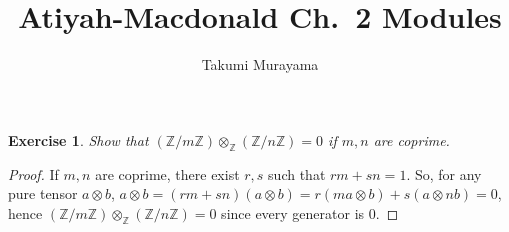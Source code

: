 \documentclass[12pt,letterpaper]{article}
\title{Atiyah-Macdonald Ch.~2 Modules}
\author{Takumi Murayama}
\newtheorem{problem}{Exercise}[section]
\theoremstyle{definition}
\theoremstyle{remark}
\newtheorem*{remark}{Remark}
\numberwithin{figure}{problem}
\numberwithin{equation}{section}
\begin{document}
\maketitle
\setcounter{section}{2}
\begin{problem}
  Show that $(\mathbb{Z}/m\mathbb{Z}) \otimes_{\mathbb{Z}} (\mathbb{Z}/n\mathbb{Z}) = 0$ if $m,n$ are coprime.
\end{problem}
%
\begin{proof}
  If $m,n$ are coprime, there exist $r,s$ such that $rm + sn = 1$. So, for any pure tensor $a \otimes b$, $a \otimes b = (rm + sn)(a \otimes b) = r(ma \otimes b) + s(a \otimes nb) = 0$, hence $(\mathbb{Z}/m\mathbb{Z}) \otimes_{\mathbb{Z}} (\mathbb{Z}/n\mathbb{Z}) = 0$ since every generator is $0$.
\end{proof}
\end{document}
